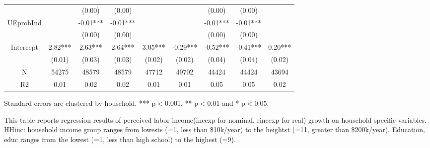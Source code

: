 \documentclass[12pt,notitlepage,onecolumn,aps,pra]{article}
\begin{document}
\begin{table}[p]
\begin{adjustbox}{width={0.9\textwidth}}
\begin{threeparttable}
\begin{tabular}{ccccccccc}
                 &           &    (0.00) &     (0.00) &             &           &     (0.00) &      (0.00) &              \\
UEprobInd        &           &  -0.01*** &   -0.01*** &             &           &   -0.01*** &    -0.01*** &              \\
                 &           &    (0.00) &     (0.00) &             &           &     (0.00) &      (0.00) &              \\
  Intercept        &   2.82*** &   2.63*** &    2.64*** &     3.05*** &  -0.29*** &   -0.52*** &    -0.41*** &      0.20*** \\
  &    (0.01) &    (0.03) &     (0.03) &      (0.02) &    (0.02) &     (0.04) &      (0.04) &       (0.02) \\           
           \hline 
N                &     54275 &     48579 &      48579 &       47712 &     49702 &      44424 &       44424 &        43694 \\
R2               &      0.01 &      0.02 &       0.02 &        0.01 &      0.01 &       0.05 &        0.05 &         0.02 \\
\hline 
\end{tabular}
\begin{tablenotes}\item Standard errors are clustered by household. *** p$<$0.001, ** p$<$0.01 and * p$<$0.05. 
\item This table reports regression results of perceived labor income(incexp for nominal, rincexp for real) growth on household specific variables. HHinc: household income group ranges from lowests (=1, less than \$10k/year) to the heightst (=11, greater than \$200k/year). Education, educ ranges from the lowest (=1, less than high school) to the highest (=9).
\end{tablenotes}
\end{threeparttable}
\end{adjustbox}
\end{table}
\end{document}
